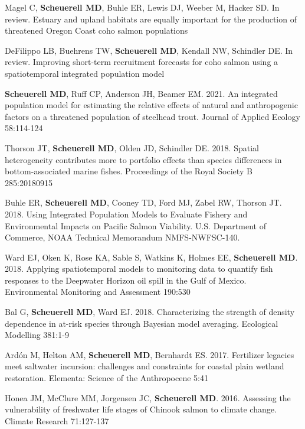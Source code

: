 \documentclass[
]{article}
\begin{document}
\vspace{-5pt}

\setlength{\parindent}{-0.375in}
\setlength{\leftskip}{0.375in}
\setlength{\parskip}{8pt}

\noindent

Magel C, \textbf{Scheuerell MD}, Buhle ER, Lewis DJ, Weeber M, Hacker
SD. In review. Estuary and upland habitats are equally important for the
production of threatened Oregon Coast coho salmon populations

DeFilippo LB, Buehrens TW, \textbf{Scheuerell MD}, Kendall NW, Schindler
DE. In review. Improving short-term recruitment forecasts for coho
salmon using a spatiotemporal integrated population model

\textbf{Scheuerell MD}, Ruff CP, Anderson JH, Beamer EM. 2021. An
integrated population model for estimating the relative effects of
natural and anthropogenic factors on a threatened population of
steelhead trout. Journal of Applied Ecology 58:114-124

Thorson JT, \textbf{Scheuerell MD}, Olden JD, Schindler DE. 2018.
Spatial heterogeneity contributes more to portfolio effects than species
differences in bottom-associated marine fishes. Proceedings of the Royal
Society B 285:20180915

Buhle ER, \textbf{Scheuerell MD}, Cooney TD, Ford MJ, Zabel RW, Thorson
JT. 2018. Using Integrated Population Models to Evaluate Fishery and
Environmental Impacts on Pacific Salmon Viability. U.S. Department of
Commerce, NOAA Technical Memorandum NMFS-NWFSC-140.

Ward EJ, Oken K, Rose KA, Sable S, Watkins K, Holmes EE,
\textbf{Scheuerell MD}. 2018. Applying spatiotemporal models to
monitoring data to quantify fish responses to the Deepwater Horizon oil
spill in the Gulf of Mexico. Environmental Monitoring and Assessment
190:530

Bal G, \textbf{Scheuerell MD}, Ward EJ. 2018. Characterizing the
strength of density dependence in at-risk species through Bayesian model
averaging. Ecological Modelling 381:1-9

Ardón M, Helton AM, \textbf{Scheuerell MD}, Bernhardt ES. 2017.
Fertilizer legacies meet saltwater incursion: challenges and constraints
for coastal plain wetland restoration. Elementa: Science of the
Anthropocene 5:41

Honea JM, McClure MM, Jorgensen JC, \textbf{Scheuerell MD}. 2016.
Assessing the vulnerability of freshwater life stages of Chinook salmon
to climate change. Climate Research 71:127-137
\end{document}
